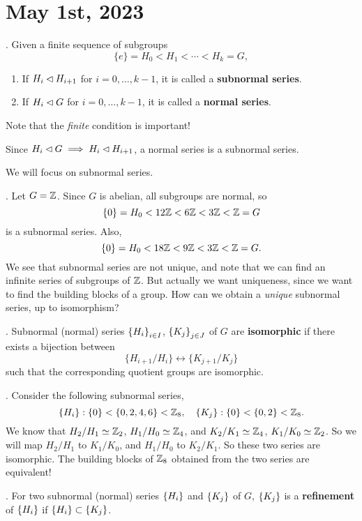 \section*{May 1st, 2023}

. Given a finite sequence of subgroups
\[
    \{e\} = H_0 < H_1 < \cdots < H_k = G,
\]
\begin{enumerate}
    \item {} If \(H_i \lhd H_{i+1}\) for \(i = 0, \dots, k - 1\), it is called a \textbf{subnormal series}.
    \item {} If \(H_i \lhd G\) for \(i = 0, \dots, k - 1\), it is called a \textbf{normal series}.
\end{enumerate}

Note that the \textit{finite} condition is important!

\rmk Since \(H_i \lhd G \implies H_i \lhd H_{i+1}\), a normal series is a subnormal series.

We will focus on subnormal series.

\ex. Let \(G = \mathbb{Z}\). Since \(G\) is abelian, all subgroups are normal, so
\[
    \{0\} = H_0 < 12\mathbb{Z} < 6\mathbb{Z} < 3\mathbb{Z} < \mathbb{Z} = G
\]
is a subnormal series. Also,
\[
    \{0\} = H_0 < 18\mathbb{Z} < 9\mathbb{Z} < 3\mathbb{Z} < \mathbb{Z} = G.
\]
We see that subnormal series are not unique, and note that we can find an infinite series of subgroups of \(\mathbb{Z}\). But actually we want uniqueness, since we want to find the building blocks of a group. How can we obtain a \textit{unique} subnormal series, up to isomorphism?

. Subnormal (normal) series \(\left\{ H_i \right\}_{i \in I}\), \(\left\{ K_j \right\}_{j \in J}\) of \(G\) are \textbf{isomorphic} if there exists a bijection between
\[
    \{H_{i+1} / H_i\} \longleftrightarrow \{K_{j+1} / K_j\}
\]
such that the corresponding quotient groups are isomorphic.

\ex. Consider the following subnormal series,
\[
    \{H_i\} : \{0\} < \{0, 2, 4, 6\} < \mathbb{Z}_8, \quad \{K_j\} : \{0\} < \{0, 2\} < \mathbb{Z}_8.
\]
We know that \(H_2 / H_1 \simeq \mathbb{Z}_2\), \(H_1 / H_0 \simeq \mathbb{Z}_4\), and \(K_2 / K_1 \simeq \mathbb{Z}_4\), \(K_1 / K_0 \simeq \mathbb{Z}_2\). So we will map \(H_2 / H_1\) to \(K_1 / K_0\), and \(H_1 / H_0\) to \(K_2 / K_1\). So these two series are isomorphic. The building blocks of \(\mathbb{Z}_8\) obtained from the two series are equivalent!

.  For two subnormal (normal) series \(\left\{ H_i \right\}\) and \(\left\{ K_j \right\}\) of \(G\), \(\left\{ K_j \right\}\) is a \textbf{refinement} of \(\left\{ H_i \right\}\) if \(\left\{ H_i \right\} \subset \left\{ K_j \right\}\).

